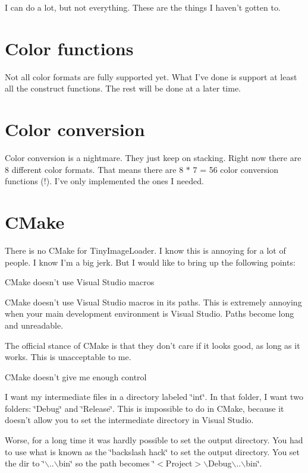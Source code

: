 I can do a lot, but not everything. These are the things I haven't gotten to.\hypertarget{bugs_colors1}{}\section{Color functions}\label{bugs_colors1}
Not all color formats are fully supported yet. What I've done is support at least all the construct functions. The rest will be done at a later time.\hypertarget{bugs_colors2}{}\section{Color conversion}\label{bugs_colors2}
Color conversion is a nightmare. They just keep on stacking. Right now there are 8 different color formats. That means there are 8 $\ast$ 7 = 56 color conversion functions (!). I've only implemented the ones I needed.\hypertarget{bugs_cmaaaaake}{}\section{CMake}\label{bugs_cmaaaaake}
There is no CMake for TinyImageLoader. I know this is annoying for a lot of people. I know I'm a big jerk. But I would like to bring up the following points:


\begin{DoxyItemize}
\item CMake doesn't use Visual Studio macros
\end{DoxyItemize}

CMake doesn't use Visual Studio macros in its paths. This is extremely annoying when your main development environment is Visual Studio. Paths become long and unreadable.

The official stance of CMake is that they don't care if it looks good, as long as it works. This is unacceptable to me.


\begin{DoxyItemize}
\item CMake doesn't give me enough control
\end{DoxyItemize}

I want my intermediate files in a directory labeled \char`\"{}int\char`\"{}. In that folder, I want two folders: \char`\"{}Debug\char`\"{} and \char`\"{}Release\char`\"{}. This is impossible to do in CMake, because it doesn't allow you to set the intermediate directory in Visual Studio.

Worse, for a long time it was hardly possible to set the output directory. You had to use what is known as the \char`\"{}backslash hack\char`\"{} to set the output directory. You set the dir to \char`\"{}$\backslash$..$\backslash$bin\char`\"{} so the path becomes \char`\"{}$<$Project$>$$\backslash$Debug$\backslash$..$\backslash$bin\char`\"{}.

